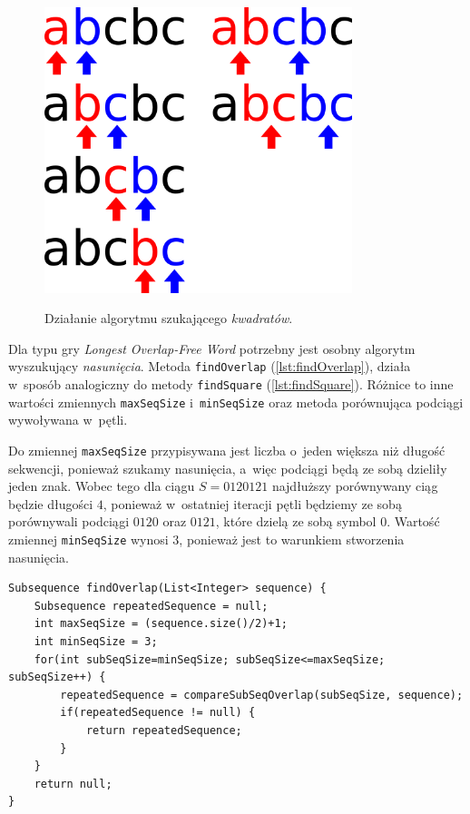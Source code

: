 \documentclass[document]{xmgr}
\begin{document}
\begin{figure}[tbh]
    \centering
    \caption{Działanie algorytmu szukającego \emph{kwadratów}.}
    \includegraphics[width = 0.8\textwidth]{images/squareFinding}
    \label{fig:squareFinding}
\end{figure}

Dla typu gry \emph{Longest Overlap-Free Word} potrzebny jest osobny algorytm wyszukujący  \emph{nasunięcia}. Metoda \texttt{findOverlap} (\ref{lst:findOverlap}), działa w~sposób analogiczny do metody \texttt{findSquare} (\ref{lst:findSquare}). Różnice to inne wartości zmiennych \texttt{maxSeqSize} i~\texttt{minSeqSize} oraz metoda porównująca podciągi wywoływana w~pętli.

Do zmiennej \texttt{maxSeqSize} przypisywana jest liczba o~jeden większa niż długość sekwencji, ponieważ szukamy nasunięcia, a~więc podciągi będą ze sobą dzieliły jeden znak. Wobec tego dla ciągu $S = 0120121$ najdłuższy porównywany ciąg będzie długości $4$, ponieważ w~ostatniej iteracji pętli będziemy ze sobą porównywali podciągi $0120$ oraz $0121$, które dzielą ze sobą symbol $0$. Wartość zmiennej \texttt{minSeqSize} wynosi $3$, ponieważ jest to warunkiem stworzenia nasunięcia.

\begin{lstlisting}[caption={Metoda szukająca \emph{nasunięć} wewnątrz listy.},label=lst:findOverlap]
Subsequence findOverlap(List<Integer> sequence) {
	Subsequence repeatedSequence = null;
	int maxSeqSize = (sequence.size()/2)+1;
	int minSeqSize = 3;
	for(int subSeqSize=minSeqSize; subSeqSize<=maxSeqSize; subSeqSize++) {
		repeatedSequence = compareSubSeqOverlap(subSeqSize, sequence);
		if(repeatedSequence != null) {
			return repeatedSequence;
		}
	}
	return null;
}
\end{lstlisting}
\end{document}
